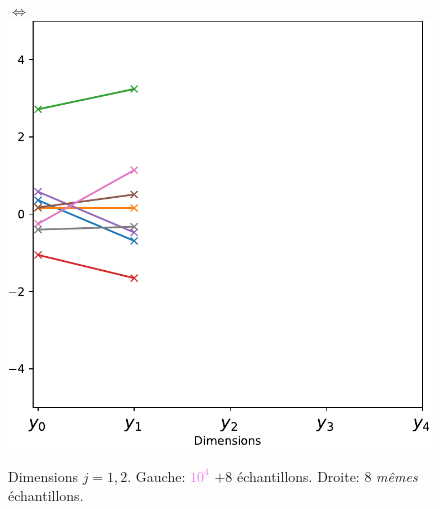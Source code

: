 \documentclass[xcolor=svgnames, t]{beamer}
\newcommand{\coloredemph}[1]{\textcolor{internationalblue}{\emph{#1}}}
\begin{document}
\begin{frame}
\begin{figure}[ht]
    $\Longleftrightarrow$
    \includegraphics[scale=0.3]{gaussian_2d_valuevsindex.pdf}
    \caption{Dimensions $j=1, 2$. Gauche: \textcolor{violet}{$10^4$} $+8$ échantillons. 
    Droite: $8$ \coloredemph{mêmes} échantillons.}
  \end{figure}
\end{frame}
\end{document}
